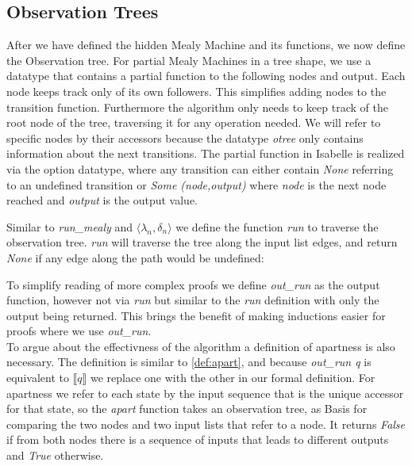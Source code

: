 \subsection{Observation Trees}
After we have defined the hidden Mealy Machine and its functions, we now define the Observation tree. For partial Mealy Machines in a tree shape, we use a datatype that contains a partial function to the following nodes and output. Each node keeps track only of its own followers. This simplifies adding nodes to the transition function. Furthermore the algorithm only needs to keep track of the root node of the tree, traversing it for any operation needed. We will refer to specific nodes by their accessors because the datatype \textit{otree} only contains information about the next transitions. The partial function in Isabelle is realized via the option datatype, where any transition can either contain \textit{None} referring to an undefined transition or \textit{Some (node,output)} where \textit{node} is the next node reached and \textit{output} is the output value. 
\begin{myisabelle}
	\otree
\end{myisabelle}
Similar to \textit{run\_mealy} and $\langle\lambda_n,\delta_n\rangle$ we define the function \textit{run} to traverse the observation tree. \textit{run} will traverse the tree along the input list edges, and return \textit{None} if any edge along the path would be undefined:
\begin{myisabelle}
	\run
\end{myisabelle}
To simplify reading of more complex proofs we define \textit{out\_run} as the output function, however not via \textit{run} but similar to the \textit{run} definition with only the output being returned. This brings the benefit of making inductions easier for proofs where we use \textit{out\_run}.\\
To argue about the effectivness of the algorithm a definition of apartness is also necessary. The definition is similar to \autoref{def:apart}, and because \textit{out\_run q} is equivalent to $\llbracket q\rrbracket$ we replace one with the other in our formal definition. For apartness we refer to each state by the input sequence that is the unique accessor for that state, so the \textit{apart} function takes an observation tree, as Basis for comparing the two nodes and two input lists that refer to a node. It returns \textit{False} if from both nodes there is a sequence of inputs that leads to different outputs and \textit{True} otherwise.
\begin{myisabelle}
	\apart
\end{myisabelle}
